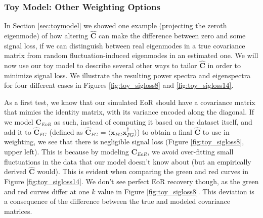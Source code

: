 \documentclass[preprint2,numberedappendix,tighten]{aastex6}  %
\begin{document}
\subsubsection{Toy Model: Other Weighting Options}
\label{sec:otherweight}

In Section \ref{sec:toymodel} we showed one example (projecting the zeroth eigenmode) of how altering $\hat{\textbf{C}}$ can make the difference between zero and some signal loss, if we can distinguish between real eigenmodes in a true covariance matrix from random fluctuation-induced eigenmodes in an estimated one. We will now use our toy model to describe several other ways to tailor $\hat{\textbf{C}}$ in order to minimize signal loss. We illustrate the resulting power spectra and eigenspectra for four different cases in Figures \ref{fig:toy_sigloss8} and \ref{fig:toy_sigloss14}.

As a first test, we know that our simulated EoR should have a covariance matrix that mimics the identity matrix, with its variance encoded along the diagonal. If we model $\textbf{C}_{EoR}$ as such, instead of computing it based on the dataset itself, and add it to $\hat{\textbf{C}}_{FG}$ (defined as $\hat{\textbf{C}}_{FG} = \langle\textbf{x}_{FG}\textbf{x}_{FG}^{\dagger}\rangle$) to obtain a final $\hat{\textbf{C}}$ to use in weighting, we see that there is negligible signal loss (Figure \ref{fig:toy_sigloss8}, upper left). This is because by modeling $\textbf{C}_{EoR}$, we avoid over-fitting small fluctuations in the data that our model doesn't know about (but an empirically derived $\hat{\textbf{C}}$ would). This is evident when comparing the green and red curves in Figure \ref{fig:toy_sigloss14}. We don't see perfect EoR recovery though, as the green and red curves differ at one $k$ value in Figure \ref{fig:toy_sigloss8}. This deviation is a consequence of the difference between the true and modeled covariance matrices.
\end{document}
